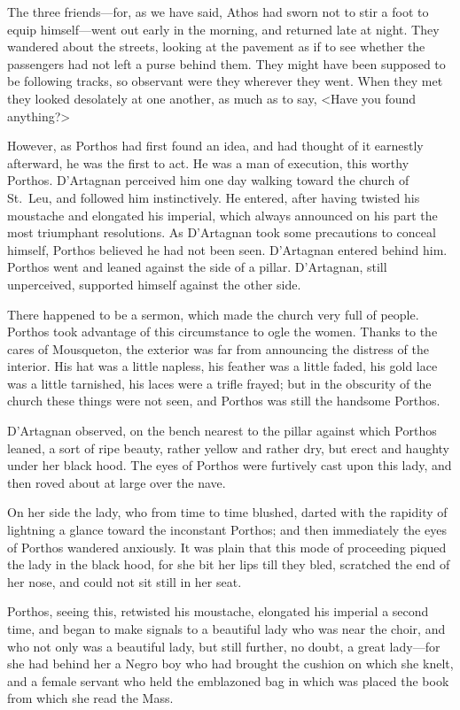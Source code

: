 The three friends—for, as we have said, Athos had sworn not to stir a foot to equip himself—went out early in the morning, and returned late at night. They wandered about the streets, looking at the pavement as if to see whether the passengers had not left a purse behind them. They might have been supposed to be following tracks, so observant were they wherever they went. When they met they looked desolately at one another, as much as to say, <Have you found anything?> 

However, as Porthos had first found an idea, and had thought of it earnestly afterward, he was the first to act. He was a man of execution, this worthy Porthos. D'Artagnan perceived him one day walking toward the church of St.~Leu, and followed him instinctively. He entered, after having twisted his moustache and elongated his imperial, which always announced on his part the most triumphant resolutions. As D'Artagnan took some precautions to conceal himself, Porthos believed he had not been seen. D'Artagnan entered behind him. Porthos went and leaned against the side of a pillar. D'Artagnan, still unperceived, supported himself against the other side. 

There happened to be a sermon, which made the church very full of people. Porthos took advantage of this circumstance to ogle the women. Thanks to the cares of Mousqueton, the exterior was far from announcing the distress of the interior. His hat was a little napless, his feather was a little faded, his gold lace was a little tarnished, his laces were a trifle frayed; but in the obscurity of the church these things were not seen, and Porthos was still the handsome Porthos. 

D'Artagnan observed, on the bench nearest to the pillar against which Porthos leaned, a sort of ripe beauty, rather yellow and rather dry, but erect and haughty under her black hood. The eyes of Porthos were furtively cast upon this lady, and then roved about at large over the nave. 

On her side the lady, who from time to time blushed, darted with the rapidity of lightning a glance toward the inconstant Porthos; and then immediately the eyes of Porthos wandered anxiously. It was plain that this mode of proceeding piqued the lady in the black hood, for she bit her lips till they bled, scratched the end of her nose, and could not sit still in her seat. 

Porthos, seeing this, retwisted his moustache, elongated his imperial a second time, and began to make signals to a beautiful lady who was near the choir, and who not only was a beautiful lady, but still further, no doubt, a great lady—for she had behind her a Negro boy who had brought the cushion on which she knelt, and a female servant who held the emblazoned bag in which was placed the book from which she read the Mass. 

